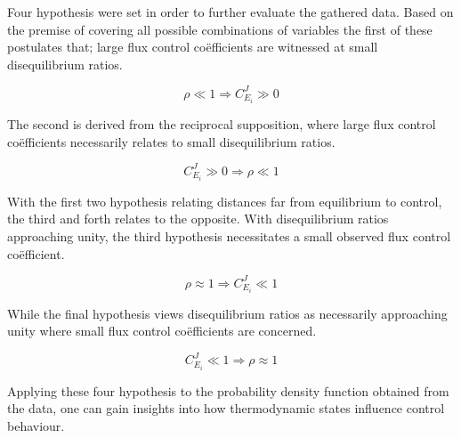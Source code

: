 Four hypothesis were set in order to further evaluate the gathered data. Based on the premise of covering all possible combinations of variables the first of these postulates that; large flux control co\"efficients are witnessed at small disequilibrium ratios.

\begin{equation}
    \rho \ll 1 \Longrightarrow C_{E_i}^J \gg 0
\end{equation}

The second is derived from the reciprocal supposition, where large flux control co\"efficients necessarily relates to small disequilibrium ratios.

\begin{equation}
    C_{E_i}^J \gg 0 \Longrightarrow \rho \ll 1
\end{equation}

With the first two hypothesis relating distances far from equilibrium to control, the third and forth relates to the opposite. With disequilibrium ratios approaching unity, the third hypothesis necessitates a small observed flux control co\"efficient.

\begin{equation}
    \rho \approx 1 \Longrightarrow C_{E_i}^J \ll 1
\end{equation}

While the final hypothesis views disequilibrium ratios as necessarily approaching unity where small flux control co\"efficients are concerned.

\begin{equation}
    C_{E_i}^J \ll 1 \Longrightarrow \rho \approx 1
\end{equation}

Applying these four hypothesis to the probability density function obtained from the data, one can gain insights into how thermodynamic states influence control behaviour. 


